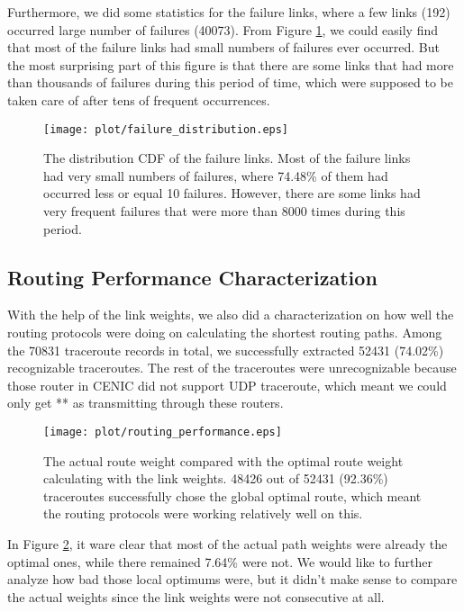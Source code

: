 \documentclass[conference, twocolumn, oneside, 10pt]{IEEEtran}
\begin{document}
Furthermore, we did some statistics for the failure links, where a few links (192) occurred large number of failures (40073). From Figure \ref{fig:distribution}, we could easily find that most of the failure links had small numbers of failures ever occurred. But the most surprising part of this figure is that there are some links that had more than thousands of failures during this period of time, which were supposed to be taken care of after tens of frequent occurrences.

\begin{figure}[h!]
\centering
\texttt{[image: plot/failure\_distribution.eps]}
\caption{The distribution CDF of the failure links. Most of the failure links had very small numbers of failures, where 74.48\% of them had occurred less or equal 10 failures. However, there are some links had very frequent failures that were more than 8000 times during this period.}
\label{fig:distribution}
\end{figure}

\subsection{Routing Performance Characterization}

With the help of the link weights, we also did a characterization on how well the routing protocols were doing on calculating the shortest routing paths. Among the 70831 traceroute records in total, we successfully extracted 52431 (74.02\%) recognizable traceroutes. The rest of the traceroutes were unrecognizable because those router in CENIC did not support UDP traceroute, which meant we could only get ** as transmitting through these routers.

\begin{figure}[h!]
\centering
\texttt{[image: plot/routing\_performance.eps]}
\caption{The actual route weight compared with the optimal route weight calculating with the link weights. 48426 out of 52431 (92.36\%) traceroutes successfully chose the global optimal route, which meant the routing protocols were working relatively well on this.}
\label{fig:routingperformance}
\end{figure}

In Figure \ref{fig:routingperformance}, it ware clear that most of the actual path weights were already the optimal ones, while there remained 7.64\% were not. We would like to further analyze how bad those local optimums were, but it didn't make sense to compare the actual weights since the link weights were not consecutive at all.
\end{document}
